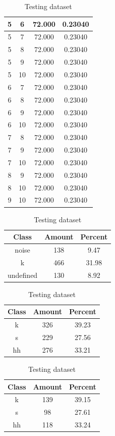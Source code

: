 \begin{table}
\begin{subtable}[h]{0.45\textwidth}
{\begin{tabular}{|c|c|c|c|}
 5 & 6 & 72.000 & 0.23040\\ \hline 
 5 & 7 & 72.000 & 0.23040\\ \hline 
 5 & 8 & 72.000 & 0.23040\\ \hline 
 5 & 9 & 72.000 & 0.23040\\ \hline 
 5 & 10 & 72.000 & 0.23040\\ \hline 
 6 & 7 & 72.000 & 0.23040\\ \hline 
 6 & 8 & 72.000 & 0.23040\\ \hline 
 6 & 9 & 72.000 & 0.23040\\ \hline 
 6 & 10 & 72.000 & 0.23040\\ \hline 
 7 & 8 & 72.000 & 0.23040\\ \hline 
 7 & 9 & 72.000 & 0.23040\\ \hline 
 7 & 10 & 72.000 & 0.23040\\ \hline 
 8 & 9 & 72.000 & 0.23040\\ \hline 
 8 & 10 & 72.000 & 0.23040\\ \hline 
 9 & 10 & 72.000 & 0.23040\\ \hline 

\end{tabular}}
\caption{xcscentroid105}
\label{xlscentroid105}
\end{subtable}

\begin{subtable}[h]{0.45\textwidth}
\centering
\begin{tabular}{|c|c|c|}
\hline
Class & Amount & Percent\\ \hline
noise & 138 & 9.47\\ \hline
k & 466 & 31.98\\ \hline
undefined & 130 & 8.92\\ \hline
\end{tabular}
\caption{Entire dataset after stripping short sounds}
\end{subtable}
\hfill
\begin{subtable}[h]{0.45\textwidth}
\centering
\begin{tabular}{|c|c|c|}
\hline
Class & Amount & Percent\\ \hline
k & 326 & 39.23\\ \hline
s & 229 & 27.56\\ \hline
hh & 276 & 33.21\\ \hline
\end{tabular}
\caption{Training dataset}
\end{subtable}
\hfill
\begin{subtable}[h]{0.45\textwidth}
\centering
\begin{tabular}{|c|c|c|}
\hline
Class & Amount & Percent\\ \hline
k & 139 & 39.15\\ \hline
s & 98 & 27.61\\ \hline
hh & 118 & 33.24\\ \hline
\end{tabular}
\caption{Testing dataset}
\end{subtable}
\hfill



\end{table}
